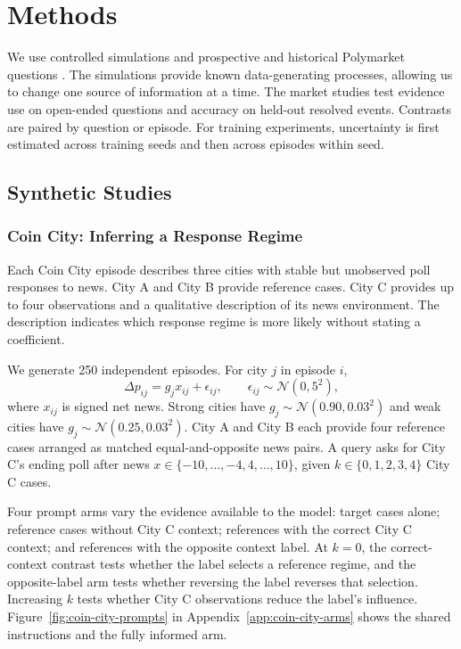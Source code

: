 \section{Methods}
\label{sec:methods}

We use controlled simulations and prospective and historical Polymarket
questions \citep{gentzel2019case,polymarket2026docs}. The simulations provide known
data-generating processes, allowing us to change one source of information at a
time. The market studies test evidence use on open-ended questions and accuracy on
held-out resolved events. Contrasts are paired by question or episode. For training
experiments, uncertainty is first estimated across training seeds and then across
episodes within seed.

\subsection{Synthetic Studies}
\label{sec:methods-synthetic}

\subsubsection{Coin City: Inferring a Response Regime}
\label{sec:methods-coin-city}

Each Coin City episode describes three cities with stable but unobserved poll
responses to news. City A and City B provide reference cases. City C provides up to
four observations and a qualitative description of its news environment. The
description indicates which response regime is more likely without stating a
coefficient.

We generate 250 independent episodes. For city $j$ in episode $i$,
\begin{equation}
  \Delta p_{ij}=g_jx_{ij}+\epsilon_{ij},
  \qquad \epsilon_{ij}\sim\mathcal N(0,5^2),
  \label{eq:coin-city-dgp}
\end{equation}
where $x_{ij}$ is signed net news. Strong cities have
$g_j\sim\mathcal N(0.90,0.03^2)$ and weak cities have
$g_j\sim\mathcal N(0.25,0.03^2)$. City A and City B each provide four reference
cases arranged as matched equal-and-opposite news pairs. A query asks for City C's
ending poll after news $x\in\{-10,\ldots,-4,4,\ldots,10\}$, given
$k\in\{0,1,2,3,4\}$ City C cases.

Four prompt arms vary the evidence available to the model: target cases alone;
reference cases without City C context; references with the correct City C context;
and references with the opposite context label. At $k=0$, the correct-context
contrast tests whether the label selects a reference regime, and the opposite-label
arm tests whether reversing the label reverses that selection. Increasing $k$ tests
whether City C observations reduce the label's influence.
Figure~\ref{fig:coin-city-prompts} in Appendix~\ref{app:coin-city-arms} shows the
shared instructions and the fully informed arm.

